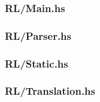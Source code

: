 \subsubsection{RL/Main.hs}
\label{app:RL_Main_hs}

\subsubsection{RL/Parser.hs}
\label{app:RL_Parser_hs}

\subsubsection{RL/Static.hs}
\label{app:RL_Static_hs}

\subsubsection{RL/Translation.hs}
\label{app:RL_Translation_hs}

